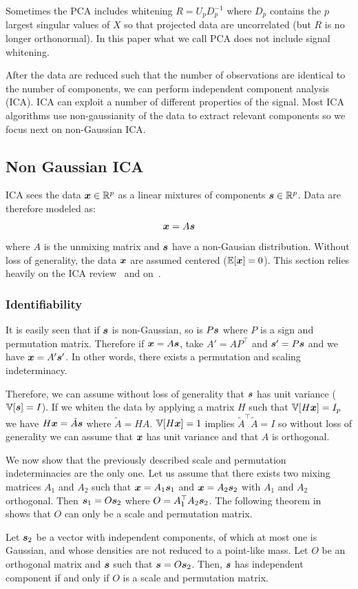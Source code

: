 Sometimes the PCA includes whitening $R = U_p D_p^{-1}$ where $D_p$ contains the
 $p$ largest singular values of $X$ so that projected data are
uncorrelated (but $R$ is no longer orthonormal). In this paper what we call PCA
does not include signal whitening.

After the data are reduced such that the number of observations are identical to
the number of components, we can perform independent component analysis (ICA).
ICA can exploit a number of different properties of the signal. Most ICA
algorithms use non-gaussianity of the data to extract relevant components so we
focus next on non-Gaussian ICA.

\subsection{Non Gaussian ICA}
ICA sees the data $\boldsymbol{x} \in \mathbb{R}^p$ as a linear mixtures of components $\boldsymbol{s} \in \mathbb{R}^p$.
Data are therefore modeled as:
\begin{align}
  \boldsymbol{x} = A \boldsymbol{s}
\end{align}
where $A$ is the unmixing matrix and $\boldsymbol{s}$ have a non-Gausian distribution.
Without loss of generality, the data $\boldsymbol{x}$ are assumed centered ($\mathbb{E}[\boldsymbol{x}] = 0$).
This section relies heavily on the ICA review~\cite{hyvarinen2000independent}
and on~\cite{cardoso1997infomax}.

\subsubsection{Identifiability}
It is easily seen that if $\boldsymbol{s}$ is non-Gaussian, so is $P \boldsymbol{s}$ where  $P$ is a
sign and permutation matrix.
Therefore if $\boldsymbol{x} = A \boldsymbol{s}$, take $A' = AP^{\top}$ and $\boldsymbol{s}'=P\boldsymbol{s}$ and we have
$\boldsymbol{x} = A' \boldsymbol{s}'$.
In other words, there exists a permutation and scaling indeterminacy.

Therefore, we can assume without loss of generality that $\boldsymbol{s}$ has unit variance ($\mathbb{V}[\boldsymbol{s}] = I$).
If we whiten the data by applying a matrix $H$ such that $\mathbb{V}[H \boldsymbol{x}] = I_p$ we have $H \boldsymbol{x} = \tilde{A} \boldsymbol{s}$ where $\tilde{A} = HA$. $\mathbb{V}[H \boldsymbol{x}] = 1$ implies $\tilde{A}^{\top} \tilde{A} = I$ so without loss of generality we can assume that $\boldsymbol{x}$ has unit variance and that $A$ is orthogonal. 

We now show that the previously described scale and permutation
indeterminacies are the only one.
Let us assume that there exists two mixing matrices $A_1$ and $A_2$ such that
$\boldsymbol{x} = A_1 \boldsymbol{s}_1$ and $\boldsymbol{x} = A_2 \boldsymbol{s}_2$ with $A_1$ and $A_2$ orthogonal. Then $\boldsymbol{s}_1 = O \boldsymbol{s}_2$ where $O = A_1^{\top} A_2 \boldsymbol{s}_2$.
The following theorem in~\cite{comon1994independent}
shows that $O$ can only be a scale and permutation matrix.
\begin{theorem}
  Let $\boldsymbol{s}_2$  be a  vector  with  independent 
  components, of   which  at  most  one  is  Gaussian,  and whose  densities
  are  not  reduced  to  a  point-like  mass. Let $O$ be an orthogonal matrix
  and $\boldsymbol{s}$ such that $\boldsymbol{s} = O \boldsymbol{s}_2$.
  Then, $\boldsymbol{s}$ has independent component if and only if $O$ is a scale and
  permutation matrix.
\end{theorem}

